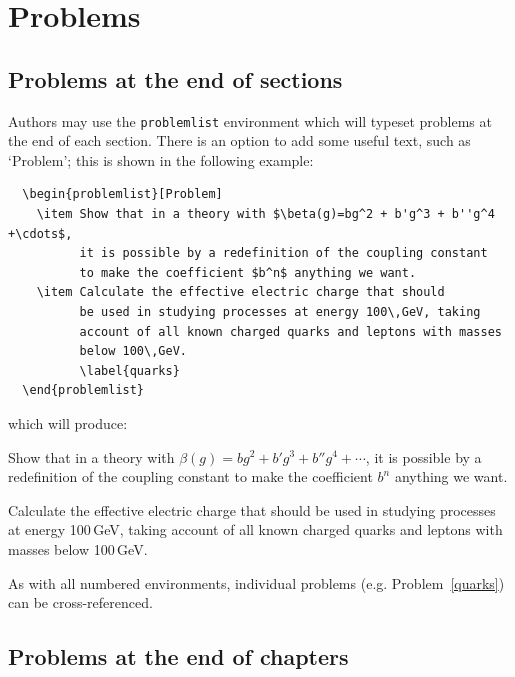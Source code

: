 \section{Problems}

\subsection{Problems at the end of sections}
\label{probendofsections}

Authors may use the \verb"problemlist" environment which will typeset problems at the end of each section. There is an option to add some useful text, such as `Problem'; this is shown in the following example:
\begin{verbatim}
  \begin{problemlist}[Problem]
    \item Show that in a theory with $\beta(g)=bg^2 + b'g^3 + b''g^4 +\cdots$,
          it is possible by a redefinition of the coupling constant
          to make the coefficient $b^n$ anything we want.
    \item Calculate the effective electric charge that should
          be used in studying processes at energy 100\,GeV, taking
          account of all known charged quarks and leptons with masses
          below 100\,GeV.
          \label{quarks}
  \end{problemlist}
\end{verbatim}
which will produce:
  \begin{problemlist}[Problem]
    \item Show that in a theory with $\beta(g)=bg^2 + b'g^3 + b''g^4 +\cdots$,
          it is possible by a redefinition of the coupling constant
          to make the coefficient $b^n$ anything we want.
    \item Calculate the effective electric charge that should
          be used in studying processes at energy 100\,GeV, taking
          account of all known charged quarks and leptons with masses
          below 100\,GeV.
          \label{quarks}
  \end{problemlist}
As with all numbered environments, individual problems (e.g. Problem~\ref{quarks}) can be cross-referenced.

\subsection{Problems at the end of chapters}

